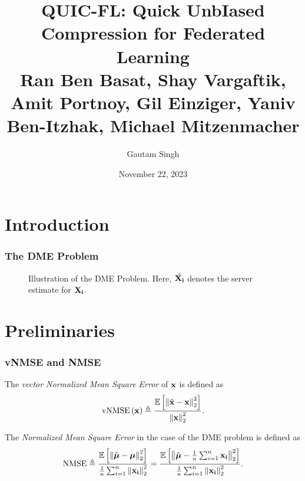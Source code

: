 \documentclass{beamer}
\title[QUIC-FL]{QUIC-FL: Quick UnbIased Compression for Federated Learning\\
\small Ran Ben Basat, Shay Vargaftik, Amit Portnoy, Gil Einziger, Yaniv Ben-Itzhak, Michael Mitzenmacher}
\date{November 22, 2023}
\author{Gautam Singh}
\institute[]{Indian Institute of Technology Hyderabad}
\begin{document}
    \maketitle
    \tableofcontents
    \section{Introduction}

    \begin{frame}
        \frametitle{The DME Problem}
        \begin{figure}[!ht]
            
            \caption{Illustration of the DME Problem. Here, \(\hat{\boldsymbol{\mathbf{X_i}}}\)
            denotes the server estimate for \(\boldsymbol{\mathbf{X_i}}\).} 
            \label{fig:dme}
        \end{figure}
    \end{frame}

    \section{Preliminaries}
    \begin{frame}
        \frametitle{vNMSE and NMSE}
        \begin{definition}[vNMSE]
        The \emph{vector Normalized Mean Square Error} of \(\boldsymbol{\mathbf{x}}\)
        is defined as
        \begin{equation}
            \mathrm{vNMSE}\left(\boldsymbol{\mathbf{x}}\right) \triangleq \frac{\mathbb{E}\left[ \left\lVert\hat{\boldsymbol{\mathbf{x}}}-\boldsymbol{\mathbf{x}}\right\rVert^2_2 \right]}{\left\lVert\boldsymbol{\mathbf{x}}\right\rVert^2_2}.
            \label{eq:vnmse-def}
        \end{equation}
        \end{definition}
        \begin{definition}[NMSE]
        The \emph{Normalized Mean Square Error} in the case of the DME
        problem is defined as
        \begin{equation}
            \mathrm{NMSE} \triangleq \frac{\mathbb{E}\left[ \left\lVert\hat{\boldsymbol{\mathbf{\mu}}}-\boldsymbol{\mathbf{\mu}}\right\rVert^2_2 \right]}{\frac{1}{n}\sum_{i=1}^n\left\lVert\boldsymbol{\mathbf{x_i}}\right\rVert^2_2} = \frac{\mathbb{E}\left[ \left\lVert\hat{\boldsymbol{\mathbf{\mu}}}-\frac{1}{n}\sum_{i=1}^n\boldsymbol{\mathbf{x_i}}\right\rVert^2_2 \right]}{\frac{1}{n}\sum_{i=1}^n\left\lVert\boldsymbol{\mathbf{x_i}}\right\rVert^2_2}.
            \label{eq:nmse-def}
        \end{equation}
        \end{definition}
    \end{frame}
\end{document}
